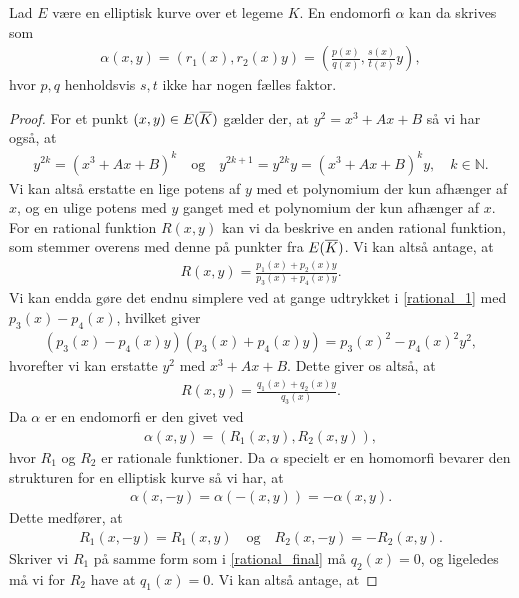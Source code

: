\begin{theorem}
\label{end_rep_theorem}
Lad $E$ være en elliptisk kurve over et legeme $K$. En endomorfi $\alpha$ kan da skrives som
\begin{align*}
	\alpha(x, y) = (r_1(x), r_2(x)y) = \left( \frac{p(x)}{q(x)}, \frac{s(x)}{t(x)}y \right),
\end{align*}
hvor $p, q$ henholdsvis $s, t$ ikke har nogen fælles faktor.
\end{theorem}
\begin{proof}
For et punkt $(x, y) \in E(\overline{K})$ gælder der, at $y^2 = x^3 + Ax + B$ så vi har også, at 
\begin{align*}
	y^{2k} = (x^3 + Ax + B)^k \quad \text{og} \quad y^{2k+1}= y^{2k}y = (x^3 + Ax + B)^k y, \quad k \in \mathbb{N}.
\end{align*}
Vi kan altså erstatte en lige potens af $y$ med et polynomium der kun afhænger af $x$, og en ulige potens med $y$ ganget med et polynomium der kun afhænger af $x$. For en rational funktion $R(x, y)$ kan vi da beskrive en anden rational funktion, som stemmer overens med denne på punkter fra $E(\overline{K})$. Vi kan altså antage, at
\begin{align}
	\label{rational_1}
	R(x, y) = \frac{p_1(x) + p_2(x)y}{p_3(x)+p_4(x)y}.
\end{align}
Vi kan endda gøre det endnu simplere ved at gange udtrykket i \eqref{rational_1} med $p_3(x)-p_4(x)$, hvilket giver 
\begin{align*}
	(p_3(x) - p_4(x)y)(p_3(x)+p_4(x)y) = p_3(x)^2 - p_4(x)^2 y^2,
\end{align*}
hvorefter vi kan erstatte $y^2$ med $x^3 + Ax + B$. Dette giver os altså, at 
\begin{align}
	\label{rational_final}
	R(x, y) = \frac{q_1(x) + q_2(x)y}{q_3(x)}.
\end{align}
Da $\alpha$ er en endomorfi er den givet ved
\begin{align*}
	\alpha(x, y) = (R_1(x, y), R_2(x, y)),
\end{align*}
hvor $R_1$ og $R_2$ er rationale funktioner. Da $\alpha$ specielt er en homomorfi bevarer den strukturen for en elliptisk kurve så vi har, at
\begin{align*}
	\alpha(x, -y) = \alpha(-(x, y)) =  -\alpha(x, y).
\end{align*}
Dette medfører, at 
\begin{align*}
	R_1(x, -y) = R_1(x, y) \quad \text{og} \quad R_2(x, -y) = -R_2(x, y).
\end{align*}
Skriver vi $R_1$ på samme form som i \eqref{rational_final} må $q_2(x) = 0$, og ligeledes må vi for $R_2$ have at $q_1(x) = 0$. Vi kan altså antage, at

\end{proof}
